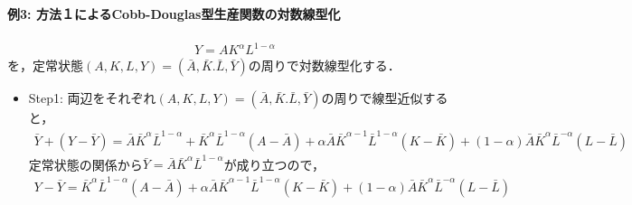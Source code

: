 \documentclass[a4paper,12pt,onecolumn,oneside,notitlepage,final]{article}
\begin{document}
\paragraph{例3: 方法１によるCobb-Douglas型生産関数の対数線型化}
\begin{align}
Y = A K^\alpha L^{1-\alpha}
\end{align}
を，定常状態$(A,K,L,Y) = (\bar A, \bar K. \bar L, \bar Y)$の周りで対数線型化する．

\begin{itemize}
\item Step1: 両辺をそれぞれ$(A,K,L,Y) = (\bar A, \bar K. \bar L, \bar Y)$の周りで線型近似すると，
\begin{align*}
\bar Y + (Y-\bar Y) = \bar A \bar K^\alpha \bar L^{1-\alpha} + \bar K^\alpha \bar L^{1-\alpha} (A - \bar A) + \alpha \bar A \bar K^{\alpha -1} \bar L^{1-\alpha} (K-\bar K) + (1-\alpha) \bar A \bar K^\alpha \bar L^{-\alpha} (L - \bar L)
\end{align*}
定常状態の関係から$\bar Y = \bar A \bar K^\alpha \bar L^{1-\alpha}$が成り立つので，
\begin{align*}
Y-\bar Y = \bar K^\alpha \bar L^{1-\alpha} (A - \bar A) + \alpha \bar A \bar K^{\alpha -1} \bar L^{1-\alpha} (K-\bar K) + (1-\alpha) \bar A \bar K^\alpha \bar L^{-\alpha} (L - \bar L)
\end{align*}


\end{itemize}
\end{document}
